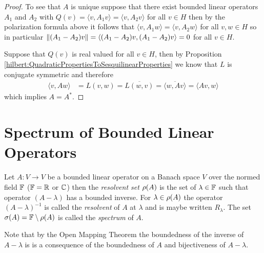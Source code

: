 \begin{proof}
To see that $A$ is unique suppose that there exist bounded linear operators $A_1$ and $A_2$ with $Q(v) = \langle v, A_1 v \rangle = \langle v, A_2 v \rangle$ for all $v \in H$ then by the polarization formula above it follows that $\langle v, A_1 w \rangle = \langle v, A_2 w \rangle$ for all $v, w \in H$ so in particular $\left \lVert (A_1-A_2) v \right \rVert = \langle (A_1 - A_2) v, (A_1 - A_2) v \rangle = 0$ for all $v \in H$.

Suppose that $Q(v)$ is real valued for all $v \in H$, then by Proposition \ref{hilbert:QuadraticPropertiesToSesquilinearProperties} we know that $L$ is conjugate symmetric and therefore 
\begin{align*}
\langle v, A w \rangle &= L(v,w) = \overline{L(w,v)} = \overline{\langle w, A v \rangle} = \langle A v, w \rangle
\end{align*}
which implies $A = A^*$.
\end{proof}

\section{Spectrum of Bounded Linear Operators}

\begin{defn}Let $A : V \to V$ be a bounded linear operator on a Banach
  space $V$ over the normed field $\mathbb{F}$ ($\mathbb{F}= \mathbb{R}$ or $\mathbb{C}$) then the \emph{resolvent set} $\rho(A)$ is the set of $\lambda \in \mathbb{F}$ such that operator $(A - \lambda)$ has a bounded inverse.  For $\lambda \in \rho(A)$ the operator $(A - \lambda)^{-1}$ is called the \emph{resolvent} of $A$ at $\lambda$ and is maybe written $R_\lambda$.  The set $\sigma(A) = \mathbb{F} \setminus \rho(A)$ is called the \emph{spectrum} of $A$.
\end{defn}

Note that by the Open Mapping Theorem the boundedness of the inverse of $A - \lambda$ is is a consequence of the boundedness of $A$ and bijectiveness of $A - \lambda$.  

